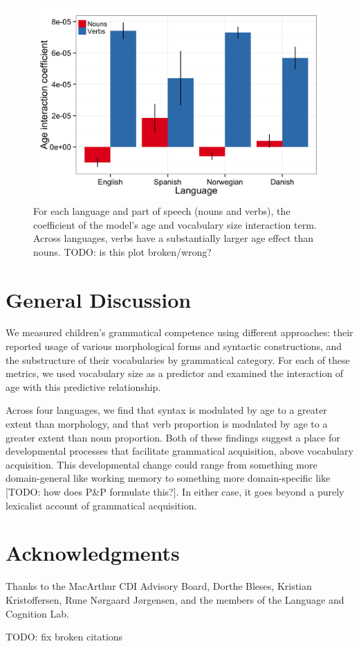 \documentclass[10pt,letterpaper]{article}
\begin{document}
\begin{figure}[!tb]
\centering
\includegraphics[width=\linewidth]{plots/coefs_noun_verb.png}
\caption{\label{fig:coefs_noun_verb} For each language and part of speech (nouns and verbs), the coefficient of the model's age and vocabulary size interaction term. Across languages, verbs have a substantially larger age effect than nouns. TODO: is this plot broken/wrong?}
\end{figure}

\section{General Discussion}

We measured children's grammatical competence using different approaches: their reported usage of various morphological forms and syntactic constructions, and the substructure of their vocabularies by grammatical category. For each of these metrics, we used vocabulary size as a predictor and examined the interaction of age with this predictive relationship.

Across four languages, we find that syntax is modulated by age to a greater extent than morphology, and that verb proportion is modulated by age to a greater extent than noun proportion. Both of these findings suggest a place for developmental processes that facilitate grammatical acquisition, above vocabulary acquisition. This developmental change could range from something more domain-general like working memory to something more domain-specific like [TODO: how does P\&P formulate this?]. In either case, it goes beyond a purely lexicalist account of grammatical acquisition.

\section{Acknowledgments}

Thanks to the MacArthur CDI Advisory Board, Dorthe Bleses, Kristian Kristoffersen, Rune N\o rgaard J\o rgensen, and the members of the Language and Cognition Lab. 



\setlength{\bibleftmargin}{.125in}
\setlength{\bibindent}{-\bibleftmargin}



TODO: fix broken citations
\end{document}
